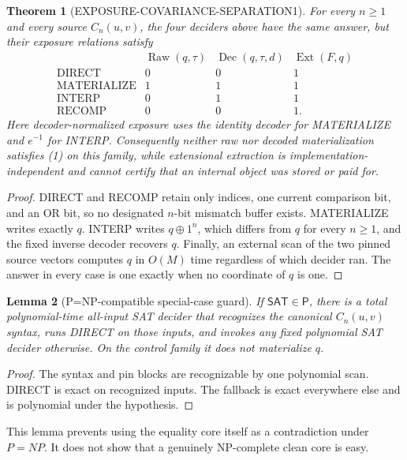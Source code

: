 \documentclass[11pt]{article}
\newtheorem{theorem}{Theorem}
\newtheorem{lemma}[theorem]{Lemma}
\newcommand{\SAT}{\mathsf{SAT}}
\newcommand{\Pclass}{\mathsf P}
\begin{document}
\begin{theorem}[EXPOSURE-COVARIANCE-SEPARATION1]
For every $n\ge1$ and every source $C_n(u,v)$, the four deciders above have
the same answer, but their exposure relations satisfy
\[
\begin{array}{c|ccc}
 &\operatorname{Raw}(q,\tau)&\operatorname{Dec}(q,\tau,d)&
   \operatorname{Ext}(F,q)\\ \hline
\text{DIRECT}&0&0&1\\
\text{MATERIALIZE}&1&1&1\\
\text{INTERP}&0&1&1\\
\text{RECOMP}&0&0&1.
\end{array}                                                   \tag{2}
\]
Here decoder-normalized exposure uses the identity decoder for MATERIALIZE
and $e^{-1}$ for INTERP.  Consequently neither raw nor decoded
materialization satisfies (1) on this family, while extensional extraction is
implementation-independent and cannot certify that an internal object was
stored or paid for.
\end{theorem}
\begin{proof}
DIRECT and RECOMP retain only indices, one current comparison bit, and an OR
bit, so no designated $n$-bit mismatch buffer exists.  MATERIALIZE writes
exactly $q$.  INTERP writes $q\oplus1^n$, which differs from $q$ for every
$n\ge1$, and the fixed inverse decoder recovers $q$.  Finally, an external
scan of the two pinned source vectors computes $q$ in $O(M)$ time regardless
of which decider ran.  The answer in every case is one exactly when no
coordinate of $q$ is one.
\end{proof}

\begin{lemma}[P=NP-compatible special-case guard]
If $\SAT\in\Pclass$, there is a total polynomial-time all-input SAT decider
that recognizes the canonical $C_n(u,v)$ syntax, runs DIRECT on those inputs,
and invokes any fixed polynomial SAT decider otherwise.  On the control
family it does not materialize $q$.
\end{lemma}
\begin{proof}
The syntax and pin blocks are recognizable by one polynomial scan.  DIRECT
is exact on recognized inputs.  The fallback is exact everywhere else and is
polynomial under the hypothesis.
\end{proof}
This lemma prevents using the equality core itself as a contradiction under
$P=NP$.  It does not show that a genuinely NP-complete clean core is easy.
\end{document}
